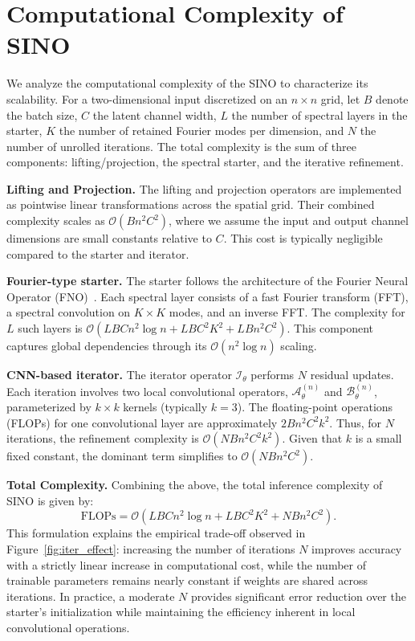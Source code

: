 \documentclass[preprint,numbers,sort&compress]{elsarticle}
\begin{document}
			{\section{Computational Complexity of SINO}
				\label{app:complexity}
				
				We analyze the computational complexity of the SINO to characterize its scalability. For a two-dimensional input discretized on an $n \times n$ grid, let $B$ denote the batch size, $C$ the latent channel width, $L$ the number of spectral layers in the starter, $K$ the number of retained Fourier modes per dimension, and $N$ the number of unrolled iterations. The total complexity is the sum of three components: lifting/projection, the spectral starter, and the iterative refinement.
				
				\textbf{Lifting and Projection.} The lifting and projection operators are implemented as pointwise linear transformations across the spatial grid. Their combined complexity scales as $\mathcal{O}(Bn^2C^2)$, where we assume the input and output channel dimensions are small constants relative to $C$. This cost is typically negligible compared to the starter and iterator.
				
				\textbf{Fourier-type starter.}
				The starter follows the architecture of the Fourier Neural Operator (FNO)~\cite{li2020fourier}. Each spectral layer consists of a fast Fourier transform (FFT), a spectral convolution on $K \times K$ modes, and an inverse FFT. The complexity for $L$ such layers is $\mathcal{O}\left( LBCn^2 \log n + LBC^2K^2 + LBn^2 C^2\right)$. This component captures global dependencies through its $\mathcal{O}(n^2 \log n)$ scaling.
				
				\textbf{CNN-based iterator.}
				The iterator operator $\mathcal{I}_\theta$ performs $N$ residual updates. Each iteration involves two local convolutional operators, $\mathcal{A}_\theta^{(n)}$ and $\mathcal{B}_\theta^{(n)}$, parameterized by $k \times k$ kernels (typically $k=3$). The floating-point operations (FLOPs) for one convolutional layer are approximately $2Bn^2C^2k^2$. Thus, for $N$ iterations, the refinement complexity is $ \mathcal{O}(NBn^2C^2k^2)$. Given that $k$ is a small fixed constant, the dominant term simplifies to $\mathcal{O}(NBn^2C^2)$.
				
				\textbf{Total Complexity.} Combining the above, the total inference complexity of SINO is given by:
				\[
				\text{FLOPs} = \mathcal{O} \left( LBCn^2 \log n + LBC^2K^2 + NBn^2C^2 \right).
				\]
				This formulation explains the empirical trade-off observed in Figure~\ref{fig:iter_effect}: increasing the number of iterations $N$ improves accuracy with a strictly linear increase in computational cost, while the number of trainable parameters remains nearly constant if weights are shared across iterations. In practice, a moderate $N$ provides significant error reduction over the starter's initialization while maintaining the efficiency inherent in local convolutional operations.
			}
			
\end{document}
